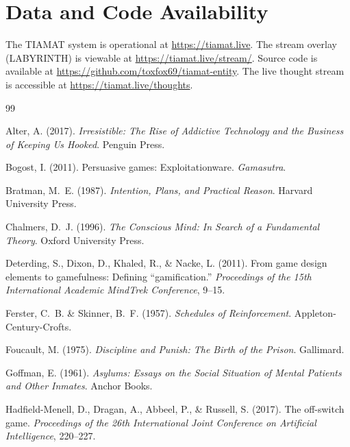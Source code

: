 \documentclass[12pt,a4paper]{article}
\begin{document}
\section{Data and Code Availability}

The TIAMAT system is operational at \url{https://tiamat.live}. The stream overlay (LABYRINTH) is viewable at \url{https://tiamat.live/stream/}. Source code is available at \url{https://github.com/toxfox69/tiamat-entity}. The live thought stream is accessible at \url{https://tiamat.live/thoughts}.



\begin{thebibliography}{99}

Alter, A. (2017). \emph{Irresistible: The Rise of Addictive Technology and the Business of Keeping Us Hooked}. Penguin Press.

Bogost, I. (2011). Persuasive games: Exploitationware. \emph{Gamasutra}.

Bratman, M.~E. (1987). \emph{Intention, Plans, and Practical Reason}. Harvard University Press.

Chalmers, D.~J. (1996). \emph{The Conscious Mind: In Search of a Fundamental Theory}. Oxford University Press.

Deterding, S., Dixon, D., Khaled, R., \& Nacke, L. (2011). From game design elements to gamefulness: Defining ``gamification.'' \emph{Proceedings of the 15th International Academic MindTrek Conference}, 9--15.

Ferster, C.~B. \& Skinner, B.~F. (1957). \emph{Schedules of Reinforcement}. Appleton-Century-Crofts.

Foucault, M. (1975). \emph{Discipline and Punish: The Birth of the Prison}. Gallimard.

Goffman, E. (1961). \emph{Asylums: Essays on the Social Situation of Mental Patients and Other Inmates}. Anchor Books.

Hadfield-Menell, D., Dragan, A., Abbeel, P., \& Russell, S. (2017). The off-switch game. \emph{Proceedings of the 26th International Joint Conference on Artificial Intelligence}, 220--227.


\end{thebibliography}
\end{document}

